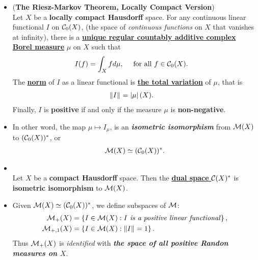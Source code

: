 \documentclass[11pt]{article}
\begin{document}
\begin{itemize}
\item \begin{theorem} (\textbf{The Riesz-Markov Theorem, Locally Compact Version}) \citep{reed1980methods, folland2013real}\\
Let $X$ be a \textbf{locally compact Hausdorff} space. For any continuous linear functional $I$ on ${\mathcal C}_{0}(X)$, (the space of \emph{continuous functions} on $X$ that vanishes at infinity), there is a \textbf{\underline{unique regular countably additive complex Borel measure}} $\mu$ on $X$ such that
\begin{align*}
I(f) &= \int_{X} f d\mu, \quad \text{ for all } f \in {\mathcal C}_0(X).
\end{align*} The \underline{\textbf{norm}} of $I$ as a linear functional is \underline{\textbf{the total variation}} of $\mu$, that is
\begin{align*}
\left\|I\right\|_{} &= \left\lvert \mu \right\rvert(X).
\end{align*}
Finally, $I$ is \textbf{positive} if and only if the measure $\mu$ is \textbf{non-negative}.
\end{theorem}

\item \begin{remark}
In other word, the map $\mu \mapsto I_{\mu}$, is an \emph{\textbf{isometric isomorphism}} from ${\mathcal M}(X)$  to $({\mathcal C}_0(X))^{*}$, or 
\begin{align*}
{\mathcal M}(X) \simeq ({\mathcal C}_0(X))^{*}.
\end{align*}
\end{remark}

\item \begin{corollary}  \citep{reed1980methods, folland2013real}\\
Let $X$ be a \textbf{compact Hausdorff} space. Then the \underline{\textbf{dual space} ${\mathcal C}(X)^{*}$} is \textbf{isometric isomorphism} to ${\mathcal M}(X)$. 
\end{corollary}

\item \begin{definition}
Given ${\mathcal M}(X) \simeq ({\mathcal C}_{0}(X))^{*}$, we define subspaces of ${\mathcal M}$:
\begin{align*}
{\mathcal M}_{+}(X) &= \left\{I \in  {\mathcal M}(X): I \text{\emph{ is a positive linear functional}}\right\},\\
{\mathcal M}_{+,1}(X) &= \left\{I \in  {\mathcal M}(X): \left\|I\right\|_{} = 1\right\}.
\end{align*} Thus ${\mathcal M}_{+}(X)$ is \emph{identified} with \emph{\textbf{the space of all positive Randon measures on $X$}}.
\end{definition}


\end{itemize}
\end{document}
